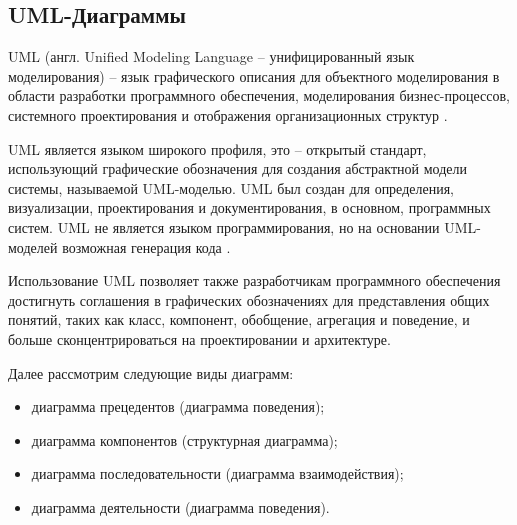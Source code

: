 \subsection{UML-Диаграммы}

UML (англ. Unified Modeling Language – унифицированный язык моделирования) – язык графического описания для объектного моделирования в области разработки программного обеспечения, моделирования бизнес-процессов, системного проектирования и отображения организационных структур \cite{uml}. 

UML является языком широкого профиля, это – открытый стандарт, использующий графические обозначения для создания абстрактной модели системы, называемой UML-моделью. UML был создан для определения, визуализации, проектирования и документирования, в основном, программных систем. UML не является языком программирования, но на основании UML-моделей возможная генерация кода \cite{uml}. 

Использование UML позволяет также разработчикам программного обеспечения достигнуть соглашения в графических обозначениях для представления общих понятий, таких как класс, компонент, обобщение, агрегация и поведение, и больше сконцентрироваться на проектировании и архитектуре. 

Далее рассмотрим следующие виды диаграмм:
\begin{itemize}
	\item диаграмма прецедентов (диаграмма поведения);
	\item диаграмма компонентов (структурная диаграмма);
	\item диаграмма последовательности (диаграмма взаимодействия);
	\item диаграмма деятельности (диаграмма поведения).
\end{itemize}


